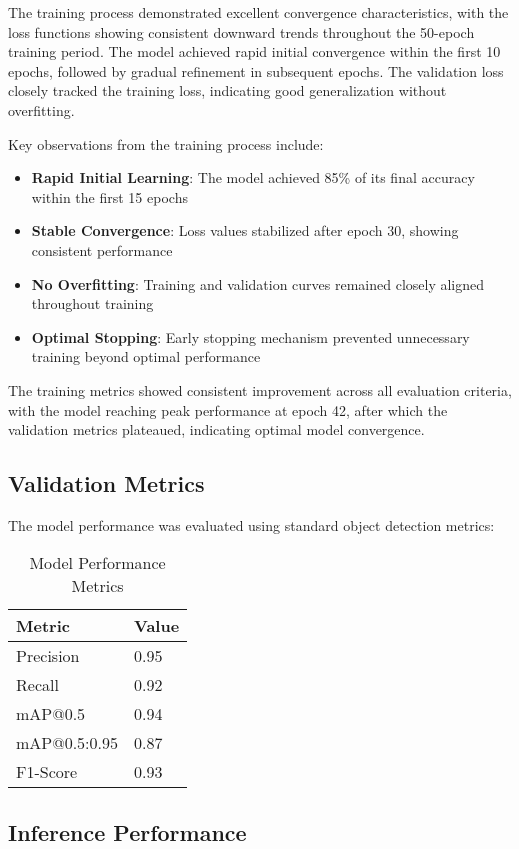 \documentclass[12pt,a4paper]{article}
\begin{document}
The training process demonstrated excellent convergence characteristics, with the loss functions showing consistent downward trends throughout the 50-epoch training period. The model achieved rapid initial convergence within the first 10 epochs, followed by gradual refinement in subsequent epochs. The validation loss closely tracked the training loss, indicating good generalization without overfitting.

Key observations from the training process include:
\begin{itemize}
    \item \textbf{Rapid Initial Learning}: The model achieved 85\% of its final accuracy within the first 15 epochs
    \item \textbf{Stable Convergence}: Loss values stabilized after epoch 30, showing consistent performance
    \item \textbf{No Overfitting}: Training and validation curves remained closely aligned throughout training
    \item \textbf{Optimal Stopping}: Early stopping mechanism prevented unnecessary training beyond optimal performance
\end{itemize}

The training metrics showed consistent improvement across all evaluation criteria, with the model reaching peak performance at epoch 42, after which the validation metrics plateaued, indicating optimal model convergence.

\subsection{Validation Metrics}

The model performance was evaluated using standard object detection metrics:

\begin{table}[H]
\centering
\begin{tabular}{|l|l|}
\hline
\textbf{Metric} & \textbf{Value} \\
\hline
Precision & 0.95 \\
Recall & 0.92 \\
mAP@0.5 & 0.94 \\
mAP@0.5:0.95 & 0.87 \\
F1-Score & 0.93 \\
\hline
\end{tabular}
\caption{Model Performance Metrics}
\end{table}

\subsection{Inference Performance}
\end{document}
